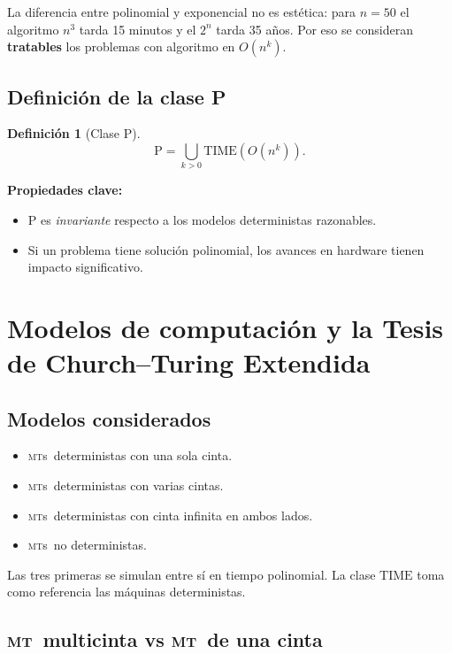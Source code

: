 \documentclass[11pt,a4paper]{article}
\theoremstyle{definicion}
\newtheorem{definicion}{Definici\'on}[section]
\newcommand{\MT}{\textsc{mt}}
\newcommand{\MTs}{\textsc{mt}s}
\newcommand{\Pclass}{\mathrm{P}}
\newcommand{\TIME}{\mathrm{TIME}}
\begin{document}
\begin{idea}
La diferencia entre polinomial y exponencial no es est\'etica: para $n=50$ el algoritmo $n^3$ tarda 15 minutos y el $2^n$ tarda 35 a\~nos. Por eso se consideran \textbf{tratables} los problemas con algoritmo en $O(n^k)$.
\end{idea}

\subsection{Definici\'on de la clase P}

\begin{definicion}[Clase $\Pclass$]
\[
\Pclass = \bigcup_{k > 0} \TIME(O(n^k)).
\]
\end{definicion}

\textbf{Propiedades clave:}
\begin{itemize}
    \item $\Pclass$ es \emph{invariante} respecto a los modelos deterministas razonables.
    \item Si un problema tiene soluci\'on polinomial, los avances en hardware tienen impacto significativo.
\end{itemize}

\section{Modelos de computaci\'on y la Tesis de Church--Turing Extendida}

\subsection{Modelos considerados}

\begin{itemize}
    \item \MTs\ deterministas con una sola cinta.
    \item \MTs\ deterministas con varias cintas.
    \item \MTs\ deterministas con cinta infinita en ambos lados.
    \item \MTs\ no deterministas.
\end{itemize}

Las tres primeras se simulan entre s\'i en tiempo polinomial. La clase $\TIME$ toma como referencia las m\'aquinas deterministas.

\subsection{\MT\ multicinta vs \MT\ de una cinta}
\end{document}
